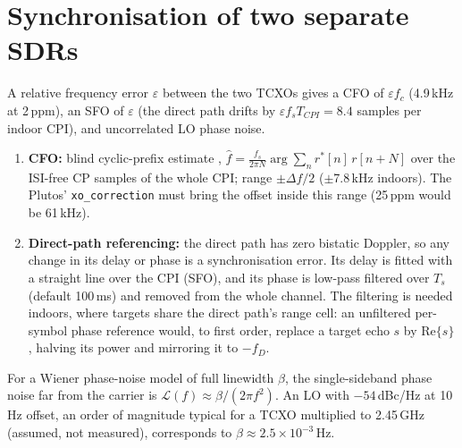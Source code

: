\documentclass[10pt,a4paper]{article}
\newcommand{\code}[1]{\texttt{#1}}
\begin{document}
\section{Synchronisation of two separate SDRs}\label{sec:sync}
A relative frequency error $\varepsilon$ between the two TCXOs gives a CFO of $\varepsilon f_c$ (4.9\,kHz at 2\,ppm), an
SFO of $\varepsilon$ (the direct path drifts by $\varepsilon f_sT_{CPI}=8.4$ samples per indoor CPI), and
uncorrelated LO phase noise.
\begin{enumerate}
\item \textbf{CFO:} blind cyclic-prefix estimate \cite{vandebeek1997},
$\hat f=\frac{f_s}{2\pi N}\arg\sum_n r^*[n]\,r[n+N]$ over the ISI-free CP samples of the whole CPI; range
$\pm\Delta f/2$ ($\pm$7.8\,kHz indoors). The Plutos' \code{xo\_correction} must bring the offset inside this
range (25\,ppm would be 61\,kHz).
\item \textbf{Direct-path referencing:} the direct path has zero bistatic Doppler, so any change in its delay or
phase is a synchronisation error. Its delay is fitted with a straight line over the CPI (SFO), and its phase is
low-pass filtered over $T_s$ (default 100\,ms) and removed from the whole channel. The filtering is needed indoors,
where targets share the direct path's range cell: an unfiltered per-symbol phase reference would, to first order,
replace a target echo $s$ by $\mathrm{Re}\{s\}$, halving its power and mirroring it to $-f_D$.
\end{enumerate}
For a Wiener phase-noise model of full linewidth $\beta$, the single-sideband phase noise far from the carrier is
$\mathcal L(f)\approx\beta/(2\pi f^2)$. An LO with $-54$\,dBc/Hz at 10\,Hz offset, an order of magnitude typical for
a TCXO multiplied to 2.45\,GHz (assumed, not measured), corresponds to $\beta\approx2.5\times10^{-3}$\,Hz.

\end{document}
